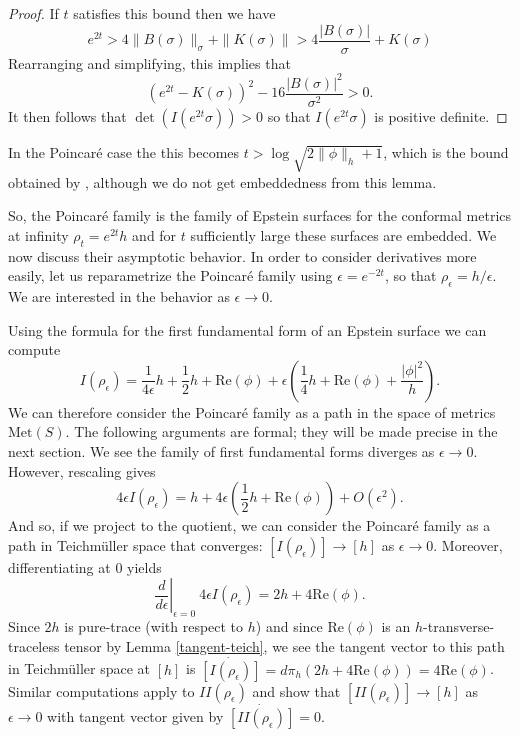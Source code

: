 \documentclass{amsart}
\newcommand{\two}{I\!\!I}
\begin{document}
\begin{proof}
If $t$ satisfies this bound then we have
\[
e^{2t} > 4 \|B(\sigma)\|_\sigma + \|K(\sigma)\| > 4 \frac{|B(\sigma)|}{\sigma} + K(\sigma)
\]
Rearranging and simplifying, this implies that 
\[
(e^{2t} - K(\sigma))^2 - 16\frac{|B(\sigma)|^2}{\sigma^2} > 0.
\]
It then follows that $\det(I(e^{2t}\sigma)) > 0$ so that $I(e^{2t}\sigma)$ is positive definite. 
\end{proof}

In the Poincar\'e case the this becomes $t > \log \sqrt{2\|\phi\|_h + 1}$, which is the bound obtained by \cite{anderson1998}, although we do not get embeddedness from this lemma. 

So, the Poincar\'e family is the family of Epstein surfaces for the conformal metrics at infinity $\rho_t = e^{2t}h$ and for $t$ sufficiently large these surfaces are embedded. 
We now discuss their asymptotic behavior. 
In order to consider derivatives more easily, let us reparametrize the Poincar\'e family using $\epsilon = e^{-2t}$, so that $\rho_\epsilon = h/\epsilon$. 
We are interested in the behavior as $\epsilon \to 0$. 

Using the formula for the first fundamental form of an Epstein surface we can compute
\[
I(\rho_\epsilon) = \frac{1}{4\epsilon} h + \frac{1}{2} h + \mathrm{Re}(\phi) + \epsilon \left( \frac{1}{4} h + \mathrm{Re}(\phi) + \frac{|\phi|^2}{h} \right).
\]
We can therefore consider the Poincar\'e family as a path in the space of metrics $\mathrm{Met}(S)$. 
The following arguments are formal; they will be made precise in the next section. 
We see the family of first fundamental forms diverges as $\epsilon \to 0$. 
However, rescaling gives
\[
4\epsilon I(\rho_\epsilon) = h + 4\epsilon \left( \frac{1}{2}h + \mathrm{Re}(\phi) \right) + O(\epsilon^2).
\]
And so, if we project to the quotient, we can consider the Poincar\'e family as a path in Teichm\"uller space that converges: $[I(\rho_\epsilon)] \to [h]$ as $\epsilon \to 0$. 
Moreover, differentiating at $0$ yields
\[
\left. \frac{d}{d\epsilon} \right|_{\epsilon = 0} \ 4\epsilon I(\rho_\epsilon) = 2h + 4 \mathrm{Re}(\phi).
\]
Since $2 h $ is pure-trace (with respect to $h$) and since $\mathrm{Re}(\phi)$ is an $h$-transverse-traceless tensor by Lemma \ref{tangent-teich}, we see the tangent vector to this path in Teichm\"uller space at $[h]$ is $\dot{[I(\rho_\epsilon)]} = d \pi_h (2h + 4 \mathrm{Re}(\phi)) = 4 \mathrm{Re}(\phi)$. Similar computations apply to $\two(\rho_\epsilon)$ and show that $[\two(\rho_\epsilon)] \to [h]$ as $\epsilon \to 0$ with tangent vector given by $\dot{[\two(\rho_\epsilon)]} = 0$. 
\end{document}
